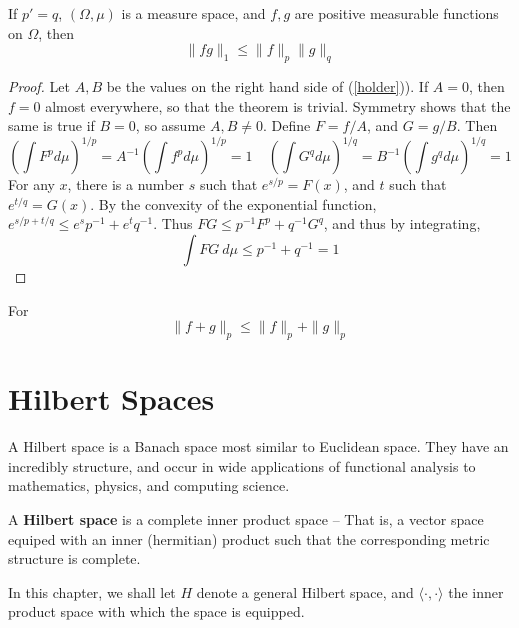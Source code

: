 \begin{theorem}[H\"{o}lder]
    If $p' = q$, $(\Omega,\mu)$ is a measure space, and $f,g$ are positive measurable functions on $\Omega$, then
    \begin{equation} \label{holder} \| fg \|_1 \leq \| f \|_p \| g \|_q \end{equation}
\end{theorem}
\begin{proof}
    Let $A,B$ be the values on the right hand side of (\ref{holder})). If $A = 0$, then $f = 0$ almost everywhere, so that the theorem is trivial. Symmetry shows that the same is true if $B = 0$, so assume $A, B \neq 0$. Define $F = f/A$, and $G = g/B$. Then
    \[ \left( \int F^p d\mu \right)^{1/p} = A^{-1} \left( \int f^p d\mu \right)^{1/p} = 1\ \ \ \ \ \left( \int G^q d\mu \right)^{1/q} = B^{-1} \left( \int g^q d\mu \right)^{1/q} = 1 \]
    For any $x$, there is a number $s$ such that $e^{s/p} = F(x)$, and $t$ such that $e^{t/q} = G(x)$. By the convexity of the exponential function, $e^{s/p + t/q} \leq e^s p^{-1} + e^t q^{-1}$. Thus $FG \leq p^{-1} F^p + q^{-1} G^q$, and thus by integrating,
    \[ \int FG\ d\mu \leq p^{-1} + q^{-1} = 1 \]
\end{proof}

\begin{corollary}[Minkowski]
    For
    \[ \| f + g \|_p \leq \| f \|_p + \| g \|_p \]
\end{corollary}



\chapter{Hilbert Spaces}

A Hilbert space is a Banach space most similar to Euclidean space. They have an incredibly structure, and occur in wide applications of functional analysis to mathematics, physics, and computing science.

\begin{definition}
    A {\bf Hilbert space} is a complete inner product space -- That is, a vector space equiped with an inner (hermitian) product such that the corresponding metric structure is complete.
\end{definition}

In this chapter, we shall let $H$ denote a general Hilbert space, and $\langle \cdot, \cdot \rangle$ the inner product space with which the space is equipped.

